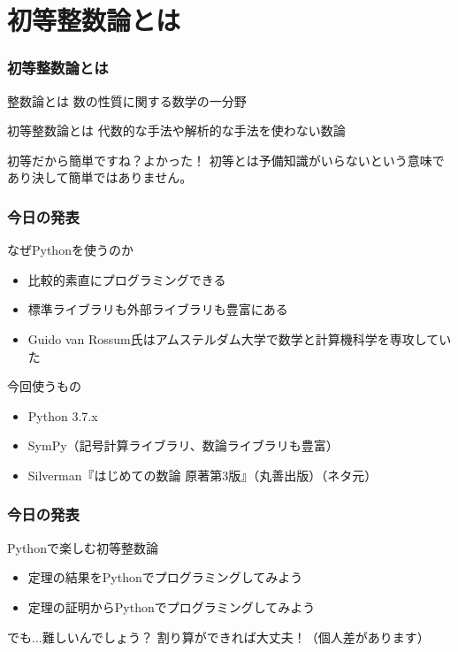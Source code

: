 \documentclass[dvipdfmx,11pt,notheorems]{beamer}
\theoremstyle{definition}
\begin{document}
\section{初等整数論とは}

\begin{frame}\frametitle{初等整数論とは}

\begin{block}{整数論とは}
数の性質に関する数学の一分野
\end{block}

\begin{block}{初等整数論とは}
代数的な手法や解析的な手法を使わない数論
\end{block}

\begin{alertblock}{初等だから簡単ですね？よかった！}
初等とは予備知識がいらないという意味であり決して簡単ではありません。
\end{alertblock}

\end{frame}

\begin{frame}\frametitle{今日の発表}

\begin{block}{なぜPythonを使うのか}
\begin{itemize}
\item 比較的素直にプログラミングできる
\item 標準ライブラリも外部ライブラリも豊富にある
\item Guido van Rossum氏はアムステルダム大学で数学と計算機科学を専攻していた
\end{itemize}
\end{block}

\begin{block}{今回使うもの}
\begin{itemize}
\item Python 3.7.x
\item SymPy（記号計算ライブラリ、数論ライブラリも豊富）
\item Silverman『はじめての数論 原著第3版』（丸善出版）（ネタ元）
\end{itemize}
\end{block}

\end{frame}

\begin{frame}\frametitle{今日の発表}

\begin{block}{Pythonで楽しむ初等整数論}
\begin{itemize}
\item 定理の結果をPythonでプログラミングしてみよう
\item 定理の証明からPythonでプログラミングしてみよう
\end{itemize}
\end{block}

\begin{exampleblock}{でも...難しいんでしょう？}
割り算ができれば大丈夫！（個人差があります）
\end{exampleblock}

\end{frame}
\end{document}
